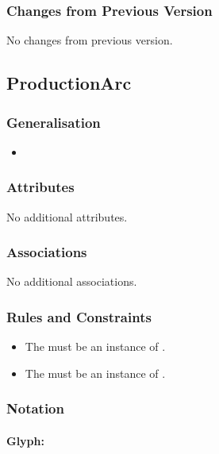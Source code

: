 \subsubsection{Changes from Previous Version}

No changes from previous version.

\subsection{ProductionArc}

\subsubsection{Generalisation}

\begin{itemize}
\item {}
\end{itemize}

\subsubsection{Attributes}

No additional attributes.

\subsubsection{Associations}

No additional associations.

\subsubsection{Rules and Constraints}

\begin{itemize}
\item The  must be an instance of .
\item The  must be an instance of
  .
\end{itemize}

\subsubsection{Notation}

\paragraph{Glyph: }\label{sec:production}

